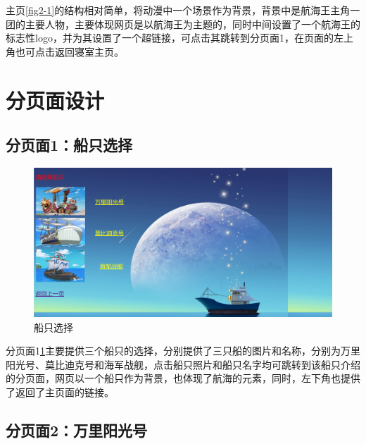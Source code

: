 \documentclass[supercite]{Experimental_Report}
\theoremstyle{definition}
\begin{document}
主页\textcolor{blue}{\ref{fig2-1}}的结构相对简单，将动漫中一个场景作为背景，背景中是航海王主角一团的主要人物，主要体现网页是以航海王为主题的，同时中间设置了一个航海王的标志性logo，并为其设置了一个超链接，可点击其跳转到分页面1，在页面的左上角也可点击返回寝室主页。


\newpage

\section{分页面设计}


\subsection{分页面1：船只选择}

\begin{figure}[htb]
	\begin{center}
		\includegraphics[scale=0.40]{images/fen1.png}
		\caption{船只选择}
		\label{fig3-1}
	\end{center}
\end{figure}

分页面1\textcolor{blue}{\ref{fig3-1}}主要提供三个船只的选择，分别提供了三只船的图片和名称，分别为万里阳光号、莫比迪克号和海军战舰，点击船只照片和船只名字均可跳转到该船只介绍的分页面，网页以一个船只作为背景，也体现了航海的元素，同时，左下角也提供了返回了主页面的链接。
\subsection{分页面2：万里阳光号}
\end{document}
